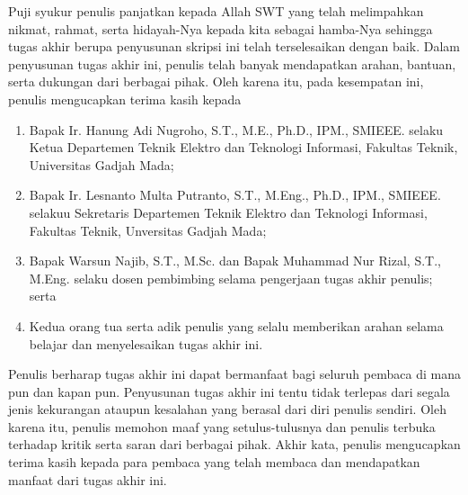 Puji syukur penulis panjatkan kepada Allah SWT yang telah melimpahkan nikmat, rahmat, serta hidayah-Nya kepada kita sebagai hamba-Nya sehingga tugas akhir berupa penyusunan skripsi ini telah terselesaikan dengan baik. Dalam penyusunan tugas akhir ini, penulis telah banyak mendapatkan arahan, bantuan, serta dukungan dari berbagai pihak. Oleh karena itu, pada kesempatan ini, penulis mengucapkan terima kasih kepada

\begin{enumerate}
	\item Bapak Ir. Hanung Adi Nugroho, S.T., M.E., Ph.D., IPM., SMIEEE. selaku Ketua Departemen Teknik Elektro dan Teknologi Informasi, Fakultas Teknik, Universitas Gadjah Mada;
 
	\item Bapak Ir. Lesnanto Multa Putranto, S.T., M.Eng., Ph.D., IPM., SMIEEE. selakuu Sekretaris Departemen Teknik Elektro dan Teknologi Informasi, Fakultas Teknik, Unversitas Gadjah Mada;
 
        \item Bapak Warsun Najib, S.T., M.Sc. dan Bapak Muhammad Nur Rizal, S.T., M.Eng. selaku dosen pembimbing selama pengerjaan tugas akhir penulis; serta
	
	\item Kedua orang tua serta adik penulis yang selalu memberikan arahan selama belajar dan menyelesaikan tugas akhir ini. 
\end{enumerate}

Penulis berharap tugas akhir ini dapat bermanfaat bagi seluruh pembaca di mana pun dan kapan pun. Penyusunan tugas akhir ini tentu tidak terlepas dari segala jenis kekurangan ataupun kesalahan yang berasal dari diri penulis sendiri. Oleh karena itu, penulis memohon maaf yang setulus-tulusnya dan penulis terbuka terhadap kritik serta saran dari berbagai pihak. Akhir kata, penulis mengucapkan terima kasih kepada para pembaca yang telah membaca dan mendapatkan manfaat dari tugas akhir ini.
